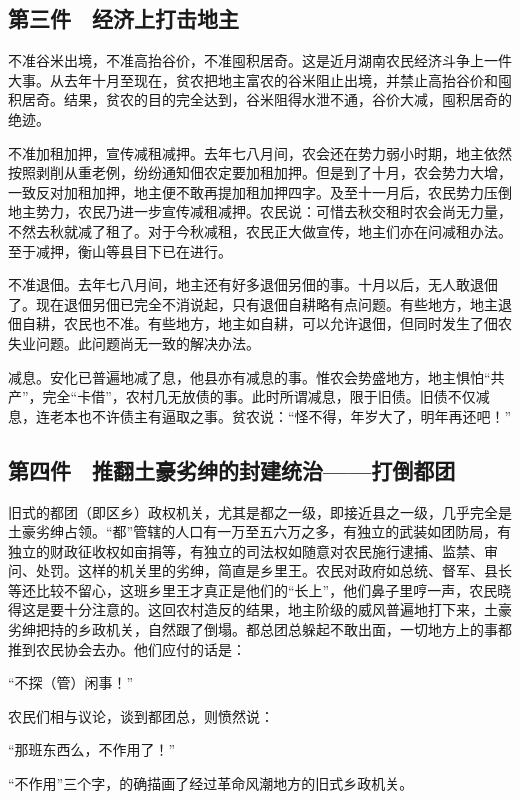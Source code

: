 \subsection*{第三件　经济上打击地主}

不准谷米出境，不准高抬谷价，不准囤积居奇。这是近月湖南农民经济斗争上一件大事。从去年十月至现在，贫农把地主富农的谷米阻止出境，并禁止高抬谷价和囤积居奇。结果，贫农的目的完全达到，谷米阻得水泄不通，谷价大减，囤积居奇的绝迹。

不准加租加押，宣传减租减押。去年七八月间，农会还在势力弱小时期，地主依然按照剥削从重老例，纷纷通知佃农定要加租加押。但是到了十月，农会势力大增，一致反对加租加押，地主便不敢再提加租加押四字。及至十一月后，农民势力压倒地主势力，农民乃进一步宣传减租减押。农民说：可惜去秋交租时农会尚无力量，不然去秋就减了租了。对于今秋减租，农民正大做宣传，地主们亦在问减租办法。至于减押，衡山等县目下已在进行。

不准退佃。去年七八月间，地主还有好多退佃另佃的事。十月以后，无人敢退佃了。现在退佃另佃已完全不消说起，只有退佃自耕略有点问题。有些地方，地主退佃自耕，农民也不准。有些地方，地主如自耕，可以允许退佃，但同时发生了佃农失业问题。此问题尚无一致的解决办法。

减息。安化已普遍地减了息，他县亦有减息的事。惟农会势盛地方，地主惧怕“共产”，完全“卡借”，农村几无放债的事。此时所谓减息，限于旧债。旧债不仅减息，连老本也不许债主有逼取之事。贫农说：“怪不得，年岁大了，明年再还吧！”

\subsection*{第四件　推翻土豪劣绅的封建统治——打倒都团}

旧式的都团（即区乡）政权机关，尤其是都之一级，即接近县之一级，几乎完全是土豪劣绅占领。“都”管辖的人口有一万至五六万之多，有独立的武装如团防局，有独立的财政征收权如亩捐等，有独立的司法权如随意对农民施行逮捕、监禁、审问、处罚。这样的机关里的劣绅，简直是乡里王。农民对政府如总统、督军、县长等还比较不留心，这班乡里王才真正是他们的“长上”，他们鼻子里哼一声，农民晓得这是要十分注意的。这回农村造反的结果，地主阶级的威风普遍地打下来，土豪劣绅把持的乡政机关，自然跟了倒塌。都总团总躲起不敢出面，一切地方上的事都推到农民协会去办。他们应付的话是：

“不探（管）闲事！”

农民们相与议论，谈到都团总，则愤然说：

“那班东西么，不作用了！”

“不作用”三个字，的确描画了经过革命风潮地方的旧式乡政机关。

